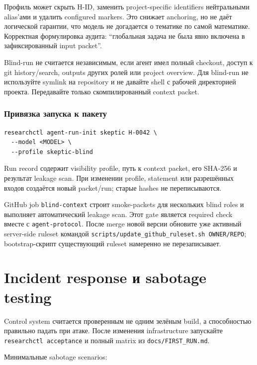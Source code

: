 \documentclass[11pt,a4paper]{article}
\newcommand{\cmd}[1]{\texttt{#1}}
\begin{document}
Профиль может скрыть H-ID, заменить project-specific identifiers нейтральными alias'ами и удалить configured markers. Это снижает anchoring, но не даёт логической гарантии, что модель не догадается о тематике по самой математике. Корректная формулировка аудита: ``глобальная задача не была явно включена в зафиксированный input packet''.

\begin{dangerbox}
Blind-run не считается независимым, если агент имел полный checkout, доступ к git history/search, outputs других ролей или project overview. Для blind-run не используйте symlink на repository и не давайте shell с рабочей директорией проекта. Передавайте только скомпилированный context packet.
\end{dangerbox}

\subsubsection{Привязка запуска к пакету}

\begin{lstlisting}
researchctl agent-run-init skeptic H-0042 \
  --model <MODEL> \
  --profile skeptic-blind
\end{lstlisting}

Run record содержит visibility profile, путь к context packet, его SHA-256 и результат leakage scan. При изменении profile, statement или разрешённых входов создаётся новый packet/run; старые hashes не переписываются.

GitHub job \texttt{blind-context} строит smoke-packets для нескольких blind roles и выполняет автоматический leakage scan. Этот gate является required check вместе с \texttt{agent-protocol}. После merge новой версии обновите уже активный server-side ruleset командой \cmd{scripts/update\_github\_ruleset.sh OWNER/REPO}; bootstrap-скрипт существующий ruleset намеренно не перезаписывает.

\section{Incident response и sabotage testing}

Control system считается проверенным не одним зелёным build, а способностью правильно падать при атаке. После изменения infrastructure запускайте \cmd{researchctl acceptance} и полный matrix из \texttt{docs/FIRST\_RUN.md}.

Минимальные sabotage scenarios:
\end{document}
